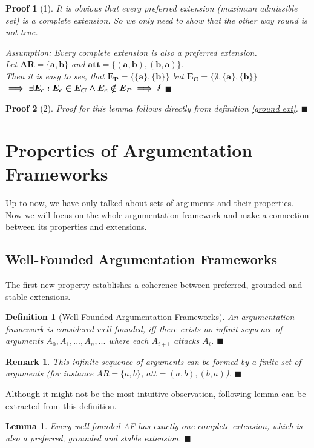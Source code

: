 \documentclass[12pt]{report}
\numberwithin{figure}{chapter}
\theoremstyle{break}
\newtheorem{defn}{Definition}[chapter]
\newtheorem{lem}{Lemma}[chapter]
\newtheorem*{prf}{Proof}
\newtheorem*{frmrk}{Remark}
\newenvironment{mydefn}{\begin{defn}}{$\blacksquare$ \end{defn}}
\newenvironment{mylem}{\begin{lem}}{$\blacksquare$ \end{lem}}
\newenvironment{myprf}{\begin{prf}}{$\blacksquare$ \end{prf}}
\newenvironment{myfrmrk}{\begin{frmrk}}{$\blacksquare$ \end{frmrk}}
\begin{document}
\begin{myprf}[1]
It is obvious that every preferred extension (maximum admissible set) is a complete extension. So we only need to show that the other way round is not true.

Assumption: Every complete extension is also a preferred extension.\\
Let $\bm{AR=\{a,b\}}$ and $\bm{att=\{(a,b),(b,a)\}}$.\\
Then it is easy to see, that $\bm{E_{P}=\{\{a\},\{b\}\}}$ but $\bm{E_{C}=\{\emptyset,\{a\},\{b\}\}}$\\
$\bm{\implies \exists E_{c}: E_{c} \in E_{C} \land E_{c} \notin E_{P} \implies \text{\Lightning}}$
\end{myprf}

\begin{myprf}[2]
Proof for this lemma follows directly from definition \ref{ground ext}.
\end{myprf}

\newpage

\section{Properties of Argumentation Frameworks}
Up to now, we have only talked about sets of arguments and their properties. Now we will focus on the whole argumentation framework and 
make a connection between its properties and extensions.

\subsection{Well-Founded Argumentation Frameworks}
The first new property establishes a coherence between preferred, grounded and stable extensions.
\begin{mydefn}[Well-Founded Argumentation Frameworks]
An argumentation framework is considered well-founded, iff there exists no infinit sequence of arguments $A_{0},A_{1},...,A_{n},...$ where each $A_{i+1}$ attacks $A_{i}$.
\end{mydefn}

\begin{myfrmrk}
This infinite sequence of arguments can be formed by a finite set of arguments (for instance $AR=\{a,b\}$, $att={(a,b),(b,a)}$).
\end{myfrmrk}

Although it might not be the most intuitive observation, following lemma can be extracted from this definition.
\begin{mylem}
Every well-founded AF has exactly one complete extension, which is also a preferred, grounded and stable extension.
\end{mylem}
\end{document}
